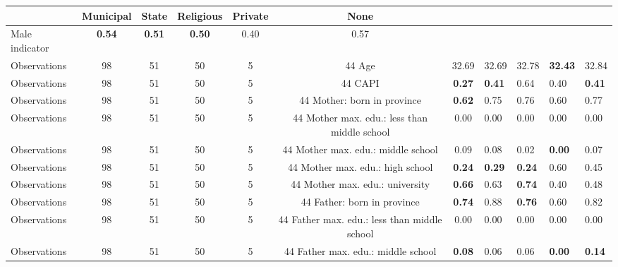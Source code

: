 \begin{tabular}{l c c c c c c }
\toprule
& \textbf{Municipal} & \textbf{State} & \textbf{Religious} & \textbf{Private} & \textbf{None} \\
\midrule
Male indicator & \textbf{     0.54} & \textbf{     0.51} & \textbf{     0.50} &      0.40 &      0.57 \\
\midrule
Observations &        98 &        51 &        50 &         5 &        44
Age &     32.69 &     32.69 &     32.78 & \textbf{    32.43} &     32.84 \\
\midrule
Observations &        98 &        51 &        50 &         5 &        44
CAPI & \textbf{     0.27} & \textbf{     0.41} &      0.64 &      0.40 & \textbf{     0.41} \\
\midrule
Observations &        98 &        51 &        50 &         5 &        44
Mother: born in province & \textbf{     0.62} &      0.75 &      0.76 &      0.60 &      0.77 \\
\midrule
Observations &        98 &        51 &        50 &         5 &        44
Mother max. edu.: less than middle school &      0.00 &      0.00 &      0.00 &      0.00 &      0.00 \\
\midrule
Observations &        98 &        51 &        50 &         5 &        44
Mother max. edu.: middle school &      0.09 &      0.08 &      0.02 & \textbf{     0.00} &      0.07 \\
\midrule
Observations &        98 &        51 &        50 &         5 &        44
Mother max. edu.: high school & \textbf{     0.24} & \textbf{     0.29} & \textbf{     0.24} &      0.60 &      0.45 \\
\midrule
Observations &        98 &        51 &        50 &         5 &        44
Mother max. edu.: university & \textbf{     0.66} &      0.63 & \textbf{     0.74} &      0.40 &      0.48 \\
\midrule
Observations &        98 &        51 &        50 &         5 &        44
Father: born in province & \textbf{     0.74} &      0.88 & \textbf{     0.76} &      0.60 &      0.82 \\
\midrule
Observations &        98 &        51 &        50 &         5 &        44
Father max. edu.: less than middle school &      0.00 &      0.00 &      0.00 &      0.00 &      0.00 \\
\midrule
Observations &        98 &        51 &        50 &         5 &        44
Father max. edu.: middle school & \textbf{     0.08} &      0.06 &      0.06 & \textbf{     0.00} & \textbf{     0.14} \\

\end{tabular}
